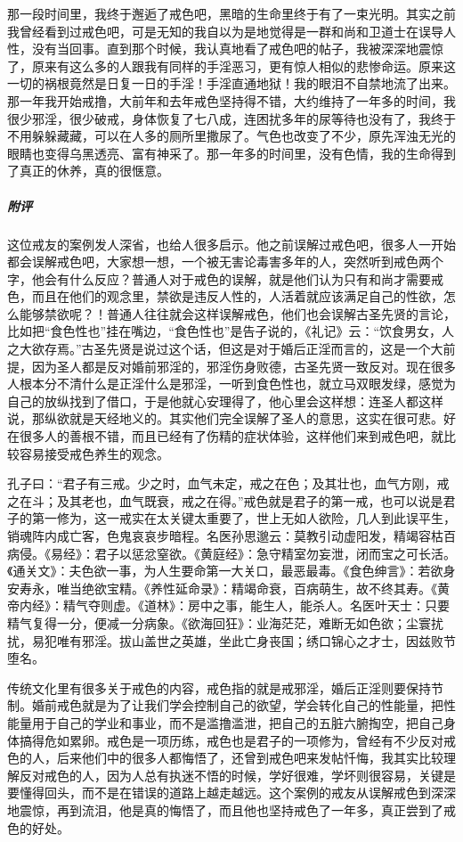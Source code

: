 \begin{case}
    那一段时间里，我终于邂逅了戒色吧，黑暗的生命里终于有了一束光明。其实之前我曾经看到过戒色吧，可是无知的我自以为是地觉得是一群和尚和卫道士在误导人性，没有当回事。直到那个时候，我认真地看了戒色吧的帖子，我被深深地震惊了，原来有这么多的人跟我有同样的手淫恶习，更有惊人相似的悲惨命运。原来这一切的祸根竟然是日复一日的手淫！手淫直通地狱！我的眼泪不自禁地流了出来。那一年我开始戒撸，大前年和去年戒色坚持得不错，大约维持了一年多的时间，我很少邪淫，很少破戒，身体恢复了七八成，连困扰多年的尿等待也没有了，我终于不用躲躲藏藏，可以在人多的厕所里撒尿了。气色也改变了不少，原先浑浊无光的眼睛也变得乌黑透亮、富有神采了。那一年多的时间里，没有色情，我的生命得到了真正的休养，真的很惬意。
    \subparagraph{附评} 这位戒友的案例发人深省，也给人很多启示。他之前误解过戒色吧，很多人一开始都会误解戒色吧，大家想一想，一个被无害论毒害多年的人，突然听到戒色两个字，他会有什么反应？普通人对于戒色的误解，就是他们认为只有和尚才需要戒色，而且在他们的观念里，禁欲是违反人性的，人活着就应该满足自己的性欲，怎么能够禁欲呢？！普通人往往就会这样误解戒色，他们也会误解古圣先贤的言论，比如把“食色性也”挂在嘴边，“食色性也”是告子说的，《礼记》云：“饮食男女，人之大欲存焉。”古圣先贤是说过这个话，但这是对于婚后正淫而言的，这是一个大前提，因为圣人都是反对婚前邪淫的，邪淫伤身败德，古圣先贤一致反对。现在很多人根本分不清什么是正淫什么是邪淫，一听到食色性也，就立马双眼发绿，感觉为自己的放纵找到了借口，于是他就心安理得了，他心里会这样想：连圣人都这样说，那纵欲就是天经地义的。其实他们完全误解了圣人的意思，这实在很可悲。好在很多人的善根不错，而且已经有了伤精的症状体验，这样他们来到戒色吧，就比较容易接受戒色养生的观念。

    孔子曰：“君子有三戒。少之时，血气未定，戒之在色；及其壮也，血气方刚，戒之在斗；及其老也，血气既衰，戒之在得。”戒色就是君子的第一戒，也可以说是君子的第一修为，这一戒实在太关键太重要了，世上无如人欲险，几人到此误平生，销魂阵内成亡客，色鬼哀哀步暗程。名医孙思邈云：莫教引动虚阳发，精竭容枯百病侵。《易经》：君子以惩忿窒欲。《黄庭经》：急守精室勿妄泄，闭而宝之可长活。《通关文》：夫色欲一事，为人生要命第一大关口，最恶最毒。《食色绅言》：若欲身安寿永，唯当绝欲宝精。《养性延命录》：精竭命衰，百病萌生，故不终其寿。《黄帝内经》：精气夺则虚。《道林》：房中之事，能生人，能杀人。名医叶天士：只要精气复得一分，便减一分病象。《欲海回狂》：业海茫茫，难断无如色欲；尘寰扰扰，易犯唯有邪淫。拔山盖世之英雄，坐此亡身丧国；绣口锦心之才士，因兹败节堕名。

    传统文化里有很多关于戒色的内容，戒色指的就是戒邪淫，婚后正淫则要保持节制。婚前戒色就是为了让我们学会控制自己的欲望，学会转化自己的性能量，把性能量用于自己的学业和事业，而不是滥撸滥泄，把自己的五脏六腑掏空，把自己身体搞得危如累卵。戒色是一项历练，戒色也是君子的一项修为，曾经有不少反对戒色的人，后来他们中的很多人都悔悟了，还曾到戒色吧来发帖忏悔，我其实比较理解反对戒色的人，因为人总有执迷不悟的时候，学好很难，学坏则很容易，关键是要懂得回头，而不是在错误的道路上越走越远。这个案例的戒友从误解戒色到深深地震惊，再到流泪，他是真的悔悟了，而且他也坚持戒色了一年多，真正尝到了戒色的好处。
\end{case}

